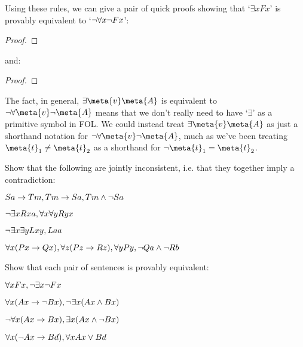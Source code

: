 

Using these rules, we can give a pair of quick proofs showing that `$\exists x Fx$' is provably equivalent to `$\neg \forall x \neg Fx$':

\begin{proof}
	\open
	 
	 
	\close
{} 
\end{proof}\noindent
and:
\begin{proof}
 
 
 
 
\end{proof}

\noindent The fact, in general, $\exists \meta{v} \meta{A}$ is equivalent to $\enot \forall \meta{v} \enot \meta{A}$ means that we don't really need to have `$\exists$' as a primitive symbol in FOL.  We could instead treat $\exists \meta{v}\meta{A}$ as just a shorthand notation for $\enot \forall \meta{v} \enot\meta{A}$, much as we've been treating $\meta{t}_1 \neq \meta{t}_2$ as a shorthand for $\enot \meta{t}_1 = \meta{t}_2$.

\practiceproblems

\problempart
Show that the following are jointly inconsistent, i.e. that they together imply a contradiction:
\begin{earg}
\item $Sa\rightarrow Tm, Tm \rightarrow Sa, Tm \wedge \neg Sa$
\item $\neg\exists x Rxa, \forall x \forall y Ryx$
\item $\neg\exists x \exists y Lxy, Laa$
\item $\forall x(Px \rightarrow Qx), \forall z(Pz \rightarrow Rz), \forall y Py, \neg Qa \wedge \neg Rb$
\end{earg}

\problempart
Show that each pair of sentences is provably equivalent:
\begin{earg}
\item $\forall x Fx, \neg \exists x \neg Fx$
\item $\forall x (Ax\rightarrow \neg Bx), \neg\exists x(Ax \wedge Bx)$
\item $\neg \forall x(Ax \rightarrow Bx), \exists x(Ax \wedge \neg Bx)$
\item $\forall x (\neg Ax\rightarrow Bd), \forall x Ax \vee Bd$
\end{earg}

